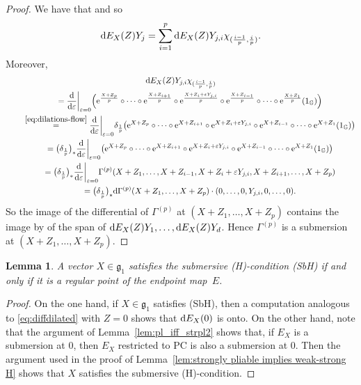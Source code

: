 \documentclass[pdftex]{sigma}
\numberwithin{equation}{section}
\newtheorem{Lemma}[Theorem]{Lemma}
\theoremstyle{definition}
\begin{document}
\begin{proof}
We have that  and so
 \[{\rm d}E_X(Z)Y_j=\sum_{i=1}^p {\rm d}E_X(Z)Y_{j,i}\chi _{(\frac{i-1}p,\frac ip)}.\]
Moreover,
\begin{gather}
 {\rm d}E_X(Z)Y_{j,i}\chi _{(\frac{i-1}p,\frac ip)}\nonumber\\
 \qquad{}=\frac{{\rm d}}{{\rm d}\varepsilon}\biggr|_{\varepsilon=0}
 \Bigl({\rm e}^{\frac{X+Z_p}p}\circ\dots\circ {\rm e}^{\frac{X+Z_{i+1}}p}\circ {\rm e}^{\frac{X+Z_i+\varepsilon Y_{j,i}}p}\circ {\rm e}^{\frac{X+Z_{i-1}}p}\circ \dots\circ {\rm e}^{\frac{X+Z_1}p}(1_{\mathbb{G}})\Bigr)\nonumber\\
 \qquad{}\stackrel{\eqref{eq:dilations-flow}}{=}\frac{{\rm d}}{{\rm d}\varepsilon}\biggr|_{\varepsilon=0}
 \delta_{\frac1p}\bigl({\rm e}^{X+Z_p}\circ\dots\circ {\rm e}^{X+Z_{i+1}}\circ {\rm e}^{X+Z_i+\varepsilon Y_{j,i}}\circ {\rm e}^{X+Z_{i-1}}\circ \dots\circ {\rm e}^{X+Z_1}(1_{\mathbb{G}})\bigr)\nonumber\\
\qquad{}=\bigl(\delta_{\frac1p}\bigr)_*\frac{{\rm d}}{{\rm d}\varepsilon}\biggr|_{\varepsilon=0}\bigl({\rm e}^{X+Z_p}\circ\dots\circ {\rm e}^{X+Z_{i+1}}\circ {\rm e}^{X+Z_i+\varepsilon Y_{j,i}}\circ {\rm e}^{X+Z_{i-1}}\circ \dots\circ {\rm e}^{X+Z_1}(1_{\mathbb{G}})\bigr)\nonumber\\
 \qquad{}=\bigl(\delta_{\frac1p}\bigr)_*\frac{{\rm d}}{{\rm d}\varepsilon}\biggr|_{\varepsilon=0}
 \Gamma^{(p)}(X+Z_{1},\dots,X+Z_{i-1},X+Z_i+\varepsilon Y_{j,i},X+Z_{i+1}, \dots, X+Z_{p})\nonumber\\
\qquad{}=\bigl(\delta_{\frac1p}\bigr)_* {\rm d}\Gamma^{(p)}(X+Z_1,\dots,X+Z_p)\cdot (0,\dots,0, Y_{j,i},0,\dots,0).\label{eq:diffdilated}
\end{gather}
So
the image of the differential of
$\Gamma^{(p)}$
at $(X\!+\!Z_1,\dots,X\!+\!Z_p)$ contains the image by  of
the
span of ${\rm d}E_X(Z)Y_1,\dots,{\rm d}E_X(Z)Y_d$.
Hence $\Gamma^{(p)}$
is a submersion at $(X\!+\!Z_1,\dots,X\!+\!Z_p)$.
\end{proof}

\begin{Lemma}
\label{le:strong=reg}
A vector $X\in{\mathfrak g}_1$ satisfies the submersive {\rm (H)}-condition {\rm (SbH)}
 if and only if it is a regular point of the endpoint map~$E$.
\end{Lemma}
\begin{proof}
On the one hand, if $X\in{\mathfrak g}_1$ satisfies
(SbH), then a computation analogous to \eqref{eq:diffdilated} with $Z=0$ shows that ${\rm d}E_X(0)$ is onto.
On the other hand,
note that the argument of Lemma~\ref{lem:pl_iff_strpl2} shows that, if $E_X$ is a submersion at $0$, then $E_X$ restricted to PC is also a submersion at $0$. Then the argument used in the proof of Lemma~\ref{lem:strongly pliable implies weak-strong H} shows that $X$ satisfies the submersive (H)-condition.
\end{proof}
\end{document}
